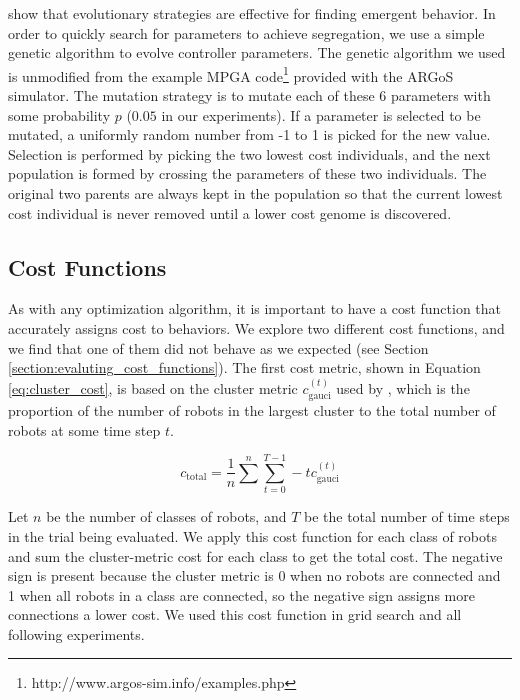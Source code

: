 \documentclass[conference]{IEEEtran}
\begin{document}
    \cite{bahgeci_evolving_2005}\cite{johnson_evolving_2016}\cite{dorigo_evolving_2004} show that evolutionary strategies are effective for finding emergent behavior. In order to quickly search for parameters to achieve segregation, we use a simple genetic algorithm to evolve controller parameters. The genetic algorithm we used is unmodified from the example MPGA code\footnote{http://www.argos-sim.info/examples.php} provided with the ARGoS simulator. The mutation strategy is to mutate each of these 6 parameters with some probability $p$ ($0.05$ in our experiments). If a parameter is selected to be mutated, a uniformly random number from -1 to 1 is picked for the new value. Selection is performed by picking the two lowest cost individuals, and the next population is formed by crossing the parameters of these two individuals. The original two parents are always kept in the population so that the current lowest cost individual is never removed until a lower cost genome is discovered.

  \subsection{Cost Functions}

    As with any optimization algorithm, it is important to have a cost function that accurately assigns cost to behaviors. We explore two different cost functions, and we find that one of them did not behave as we expected (see Section \ref{section:evaluting_cost_functions}). The first cost metric, shown in Equation \eqref{eq:cluster_cost}, is based on the cluster metric $c_{\text{gauci}}^{(t)}$ used by \cite{gauci_self-organized_2014}, which is the proportion of the number of robots in the largest cluster to the total number of robots at some time step $t$.

    \begin{equation} \label{eq:cluster_cost}
      c_{\text{total}} =  \frac{1}{n}\sum^n\sum_{t=0}^{T-1} -t c_{\text{gauci}}^{(t)}
    \end{equation}

    Let $n$ be the number of classes of robots, and $T$ be the total number of time steps in the trial being evaluated. We apply this cost function for each class of robots and sum the cluster-metric cost for each class to get the total cost. The negative sign is present because the cluster metric is 0 when no robots are connected and 1 when all robots in a class are connected, so the negative sign assigns more connections a lower cost. We used this cost function in grid search and all following experiments.
\end{document}
